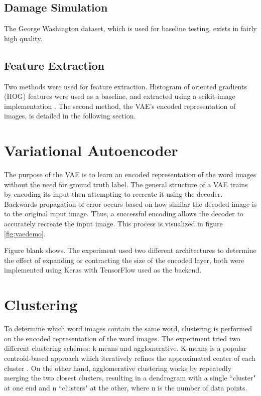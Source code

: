 \documentclass[final]{ukthesis}
\begin{document}
\subsection{Damage Simulation}
The George Washington dataset, which is used for baseline testing, exists in fairly high quality.


\subsection{Feature Extraction}
Two methods were used for feature extraction. Histogram of oriented gradients (HOG) features were used as a baseline, and extracted using a scikit-image implementation \cite{van2014scikit}. The second method, the VAE's encoded representation of images, is detailed in the following section.



%
%
\section{Variational Autoencoder}

The purpose of the VAE is to learn an encoded representation of the word images without the need for ground truth label. The general structure of a VAE trains by encoding its input then attempting to recreate it using the decoder. Backwards propagation of error occurs based on how similar the decoded image is to the original input image. Thus, a successful encoding allows the decoder to accurately recreate the input image. This process is visualized in figure \ref{fig:vaedemo}.

Figure blank shows. The experiment used two different architectures to determine the effect of expanding or contracting the size of the encoded layer, both were implemented using Keras \cite{chollet2015keras} with TensorFlow \cite{abadi2016tensorflow} used as the backend.


\section{Clustering}
To determine which word images contain the same word, clustering is performed on the encoded representation of the word images. The experiment tried two different clustering schemes: k-means and agglomerative. K-means is a popular centroid-based approach which iteratively refines the approximated center of each cluster \cite{lloyd1982least,likas2003global}. On the other hand, agglomerative clustering works by repeatedly merging the two closest clusters, resulting in a dendrogram with a single ``cluster" at one end and n ``clusters" at the other, where n is the number of data points.
\end{document}
